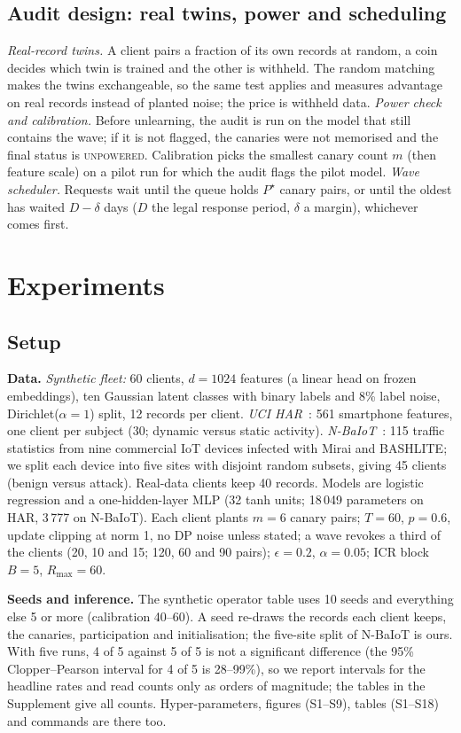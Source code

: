 \documentclass[journal]{IEEEtran}
\begin{document}
\subsection{Audit design: real twins, power and scheduling}
\emph{Real-record twins.} A client pairs a fraction of its own records at random, a coin decides which twin is trained and the other is withheld. The random matching makes the twins exchangeable, so the same test applies and measures advantage on real records instead of planted noise; the price is withheld data.
\emph{Power check and calibration.} Before unlearning, the audit is run on the model that still contains the wave; if it is not flagged, the canaries were not memorised and the final status is \textsc{unpowered}. Calibration picks the smallest canary count $m$ (then feature scale) on a pilot run for which the audit flags the pilot model.
\emph{Wave scheduler.} Requests wait until the queue holds $P^\star$ canary pairs, or until the oldest has waited $D-\delta$ days ($D$ the legal response period, $\delta$ a margin), whichever comes first.

\section{Experiments}
\subsection{Setup}
\textbf{Data.} \emph{Synthetic fleet:} 60 clients, $d=1024$ features (a linear head on frozen embeddings), ten Gaussian latent classes with binary labels and 8\% label noise, Dirichlet($\alpha{=}1$) split, 12 records per client. \emph{UCI HAR}~\cite{anguita2013,reyesortiz2013uci}: 561 smartphone features, one client per subject (30; dynamic versus static activity). \emph{N-BaIoT}~\cite{meidan2018}: 115 traffic statistics from nine commercial IoT devices infected with Mirai and BASHLITE; we split each device into five sites with disjoint random subsets, giving 45 clients (benign versus attack). Real-data clients keep 40 records. Models are logistic regression and a one-hidden-layer MLP (32 tanh units; 18\,049 parameters on HAR, 3\,777 on N-BaIoT). Each client plants $m=6$ canary pairs; $T=60$, $p=0.6$, update clipping at norm 1, no DP noise unless stated; a wave revokes a third of the clients (20, 10 and 15; 120, 60 and 90 pairs); $\epsilon=0.2$, $\alpha=0.05$; ICR block $B=5$, $R_{\max}=60$.

\textbf{Seeds and inference.} The synthetic operator table uses 10 seeds and everything else 5 or more (calibration 40--60). A seed re-draws the records each client keeps, the canaries, participation and initialisation; the five-site split of N-BaIoT is ours. With five runs, 4 of 5 against 5 of 5 is not a significant difference (the 95\% Clopper--Pearson interval for 4 of 5 is 28--99\%), so we report intervals for the headline rates and read counts only as orders of magnitude; the tables in the Supplement give all counts. Hyper-parameters, figures (S1--S9), tables (S1--S18) and commands are there too.
\end{document}
